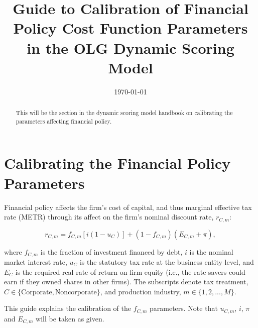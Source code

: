 \documentclass[article,11pt,letterpaper,fleqn]{article}
\title{Guide to Calibration of Financial Policy Cost Function Parameters in the OLG Dynamic Scoring Model}
\date{\today}
\theoremstyle{definition}
\numberwithin{equation}{section}
\newcommand\ve{\varepsilon}
\begin{document}

\maketitle



\begin{abstract}
This will be the section in the dynamic scoring model handbook on calibrating the parameters affecting financial policy.
\end{abstract}

\section{Calibrating the Financial Policy Parameters}

Financial policy affects the firm's cost of capital, and thus marginal effective tax rate (METR) through its affect on the firm's nominal discount rate, $r_{C,m}$:

\begin{equation}
r_{C,m} = f_{C,m} \left[i(1-u_{C})\right]+ (1-f_{C,m})(E_{C,m}+\pi),
\end{equation}

where $f_{C,m}$ is the fraction of investment financed by debt,  $i$ is the nominal market interest rate, $u_{C}$ is the statutory tax rate at the business entity level, and $E_{C}$ is the required real rate of return on firm equity (i.e., the rate savers could earn if they owned shares in other firms).  The subscripts denote tax treatment, $C\in \{\text{Corporate}, \text{Noncorporate}\}$, and production industry, $m\in \{1, 2, ..., M\}$. 

This guide explains the calibration of the $f_{C,m}$ parameters.  Note that $u_{C,m}$, $i$, $\pi$ and $E_{C,m}$ will be taken as given. 
%
%
%
\end{document}
